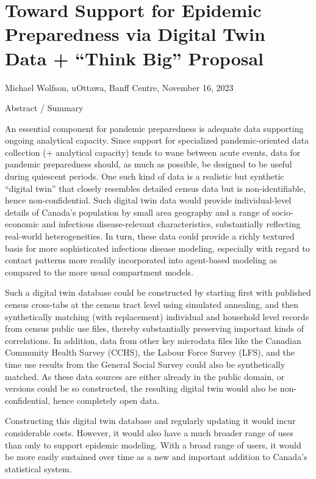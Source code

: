 \hypertarget{toward-support-for-epidemic-preparedness-via-digital-twin-data-think-big-proposal}{%
\section{Toward Support for Epidemic Preparedness via Digital Twin Data
+ ``Think Big''
Proposal}\label{toward-support-for-epidemic-preparedness-via-digital-twin-data-think-big-proposal}}

Michael Wolfson, uOttawa, Banff Centre, November 16, 2023

Abstract / Summary

An essential component for pandemic preparedness is adequate data
supporting ongoing analytical capacity. Since support for specialized
pandemic-oriented data collection (+ analytical capacity) tends to wane
between acute events, data for pandemic preparedness should, as much as
possible, be designed to be useful during quiescent periods. One such
kind of data is a realistic but synthetic ``digital twin'' that closely
resembles detailed census data but is non-identifiable, hence
non-confidential. Such digital twin data would provide individual-level
details of Canada's population by small area geography and a range of
socio-economic and infectious disease-relevant characteristics,
substantially reflecting real-world heterogeneities. In turn, these data
could provide a richly textured basis for more sophisticated infectious
disease modeling, especially with regard to contact patterns more
readily incorporated into agent-based modeling as compared to the more
usual compartment models.

Such a digital twin database could be constructed by starting first with
published census cross-tabs at the census tract level using simulated
annealing, and then synthetically matching (with replacement) individual
and household level records from census public use files, thereby
substantially preserving important kinds of correlations. In addition,
data from other key microdata files like the Canadian Community Health
Survey (CCHS), the Labour Force Survey (LFS), and the time use results
from the General Social Survey could also be synthetically matched. As
these data sources are either already in the public domain, or versions
could be so constructed, the resulting digital twin would also be
non-confidential, hence completely open data.

Constructing this digital twin database and regularly updating it would
incur considerable costs. However, it would also have a much broader
range of uses than only to support epidemic modeling. With a broad range
of users, it would be more easily sustained over time as a new and
important addition to Canada's statistical system.

